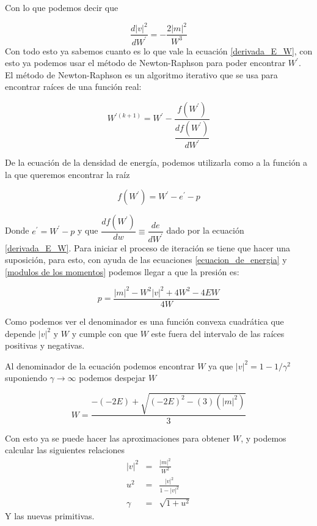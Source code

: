 \documentclass[12pt,a4paper]{book}
\providecommand{\abs}[1]{\lvert#1\rvert} %
\begin{document}
Con lo que podemos decir que 

\begin{equation}\label{der_v2}
\dfrac{d\abs{v}^2}{d W^{'} }=-\frac{2 \abs{m}^{2}}{W^{3}}
\end{equation}
Con todo esto ya sabemos cuanto es lo que vale la ecuación \ref{derivada_E_W}, con esto ya podemos usar el método de Newton-Raphson para poder encontrar $W^{'}$.\\

El método de Newton-Raphson es un algoritmo iterativo que se usa para encontrar raíces  de una función real:

\begin{equation} \label{eq_Newton_Raphson}
W^{'(k+1)}=W^{'}-\frac{f(W^{'})}{\dfrac{d f(W^{'})}{d W^{'}}}
\end{equation}

De la ecuación de la densidad de energía, podemos utilizarla como a la función a la que queremos encontrar la raíz

\begin{equation} \label{ecuación_f}
f(W^{'})=W^{'}-e^{'}-p
\end{equation}

Donde $e^{'}=W^{'}-p$ y que $\dfrac{d f(W^{'})}{d w} \equiv \dfrac{de}{dW^{'}}$ dado por la ecuación \ref{derivada_E_W}. 
Para iniciar el proceso de iteración se tiene que hacer una suposición, para esto, con ayuda de las ecuaciones \ref{ecuacion_de_energia} 
y \ref{modulos de los momentos} podemos llegar a que la presión es:

\begin{equation} \label{presion_de_newton}
p=\frac{\abs{m}^{2}-W^{2}\abs{v}^{2}+4W^{2}-4EW}{4W}
\end{equation}

Como podemos ver el denominador es una función convexa cuadrática que depende $\abs{v}^{2}$ y $W$ y cumple con que $W$ este fuera del intervalo de las raíces positivas y negativas.

Al denominador de la  ecuación podemos encontrar $W$ ya que $\abs{v}^{2}=1-1/\gamma^{2}$ suponiendo $\gamma \rightarrow \infty$ podemos despejar $W$

\begin{equation}\label{suposicion_de_W}
W=\frac{-(-2E)+\sqrt{(-2E)^{2}-(3)(\abs{m}^{2})}}{3}
\end{equation}

Con esto ya se puede hacer las aproximaciones para obtener $W$, y podemos calcular las siguientes relaciones 
\begin{eqnarray}
\abs{v}^{2} &=& \frac{\abs{m}^{2}}{W^{2}}\label{prim_v2}\\ 
u^{2}&=&\frac{\abs{v}^{2}}{1-\abs{v}^{2}}\label{u2}\\
\gamma &=& \sqrt{1+u^{2}}
\end{eqnarray}
Y las nuevas primitivas.\\
\end{document}
